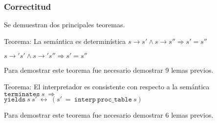 \begin{frame}
\frametitle{Correctitud}

Se demuestran dos principales teoremas.

\begin{block}{Teorema: La semántica es determinística}
$s \rightarrow s' \land s \rightarrow s'' \Longrightarrow s' = s''$

$s \rightarrow' s' \land s \rightarrow' s'' \Longrightarrow s' = s''$
\end{block}

Para demostrar este teorema fue necesario demostrar 9 lemas previos.


\begin{block}{Teorema: El interpretador es consistente con respecto a la semántica}
$\mathtt{terminates}\ s\ \Longrightarrow\ $
\\
$\mathtt{yields}\ s\ s'\ \longleftrightarrow\ (s'\ =\ \mathtt{interp}\ \mathtt{proc\_table}\ s)$
\end{block}

Para demostrar este teorema fue necesario demostrar 6 lemas previos.

\end{frame}

